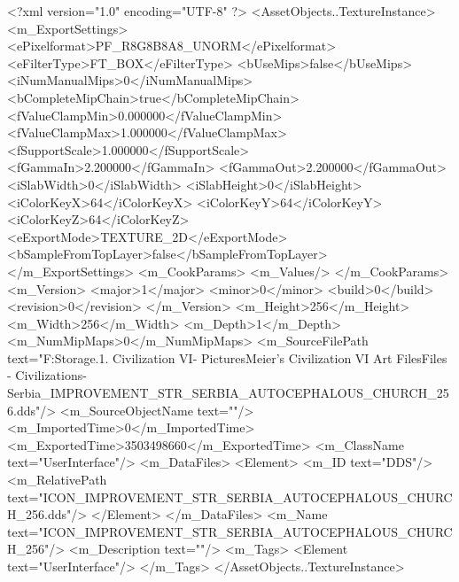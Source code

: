 <?xml version="1.0" encoding="UTF-8" ?>
<AssetObjects..TextureInstance>
	<m_ExportSettings>
		<ePixelformat>PF_R8G8B8A8_UNORM</ePixelformat>
		<eFilterType>FT_BOX</eFilterType>
		<bUseMips>false</bUseMips>
		<iNumManualMips>0</iNumManualMips>
		<bCompleteMipChain>true</bCompleteMipChain>
		<fValueClampMin>0.000000</fValueClampMin>
		<fValueClampMax>1.000000</fValueClampMax>
		<fSupportScale>1.000000</fSupportScale>
		<fGammaIn>2.200000</fGammaIn>
		<fGammaOut>2.200000</fGammaOut>
		<iSlabWidth>0</iSlabWidth>
		<iSlabHeight>0</iSlabHeight>
		<iColorKeyX>64</iColorKeyX>
		<iColorKeyY>64</iColorKeyY>
		<iColorKeyZ>64</iColorKeyZ>
		<eExportMode>TEXTURE_2D</eExportMode>
		<bSampleFromTopLayer>false</bSampleFromTopLayer>
	</m_ExportSettings>
	<m_CookParams>
		<m_Values/>
	</m_CookParams>
	<m_Version>
		<major>1</major>
		<minor>0</minor>
		<build>0</build>
		<revision>0</revision>
	</m_Version>
	<m_Height>256</m_Height>
	<m_Width>256</m_Width>
	<m_Depth>1</m_Depth>
	<m_NumMipMaps>0</m_NumMipMaps>
	<m_SourceFilePath text="F:\Mod Storage\2.1. Civilization VI\Mods\Archive - Pictures\Sid Meier's Civilization VI Art Files\Art Files - Civilizations\Civilization - Serbia\ICON_IMPROVEMENT_STR_SERBIA_AUTOCEPHALOUS_CHURCH_256.dds"/>
	<m_SourceObjectName text=""/>
	<m_ImportedTime>0</m_ImportedTime>
	<m_ExportedTime>3503498660</m_ExportedTime>
	<m_ClassName text="UserInterface"/>
	<m_DataFiles>
		<Element>
			<m_ID text="DDS"/>
			<m_RelativePath text="ICON_IMPROVEMENT_STR_SERBIA_AUTOCEPHALOUS_CHURCH_256.dds"/>
		</Element>
	</m_DataFiles>
	<m_Name text="ICON_IMPROVEMENT_STR_SERBIA_AUTOCEPHALOUS_CHURCH_256"/>
	<m_Description text=""/>
	<m_Tags>
		<Element text="UserInterface"/>
	</m_Tags>
</AssetObjects..TextureInstance>

